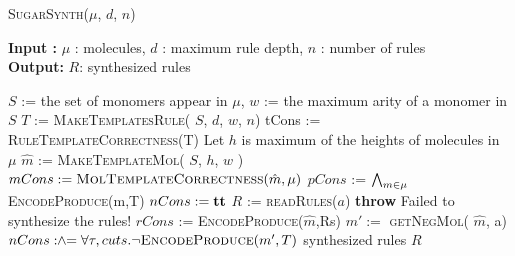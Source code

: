 
\begin{algorithm}[t]
  \caption{ \textsc{SugarSynth}($\mu$, $d$, $n$)}
  \textbf{Input     :} $\mu$ : molecules, $d$ : maximum rule depth, $n$ : number of rules \\
      \textbf{Output:}  $R$: synthesized rules
  \label{alg:sugar-synth}
  \begin{algorithmic}[1]
  \State $S$ := the set of monomers appear in $\mu$, $w$ := the maximum arity of a monomer in $S$
  \State $T$ := \textsc{MakeTemplatesRule}( $S$, $d$, $w$, $n$)
  \label{line:createRtemp}
  \State tCons := \textsc{RuleTemplateCorrectness}(T)
  \label{line:ruleCorr}
  \State Let $h$ is maximum of the heights of molecules in $\mu$
  \State $\hat{m}$ := \textsc{MakeTemplateMol}( $S$, $h$, $w$ )
  \label{line:createMtemp}
  \State $mCons := \textsc{MolTemplateCorrectness}(\hat{m},\mu)$
  \label{line:molCorr}
  \State $pCons$ := $\bigwedge_{m \in \mu}$ \textsc{EncodeProduce}(m,T)
    \label{line:molenc}
  \State $nCons := \mathbf{tt}$
  \While{$\ltrue$} 
    \label{line:posModel}
    \State $R$ := \textsc{readRules}($a$)
    \label{line:getR}
    \Else
       \State \textbf{ throw} Failed to synthesize the rules!
    \EndIf
    \State $rCons$ := \textsc{EncodeProduce}($\hat{m}$,Rs)
    \label{line:consNewR}
        \label{line:negModel}
        \State $m' :=$ \textsc{getNegMol}( $\hat{m}$, a)
        \State $nCons \mathrel{:\hspace{-3pt}\land\hspace{-3pt}=} \forall \tau,cuts. \lnot \textsc{EncodeProduce}(m',T)$
        \label{line:encode-neg-mol}
        \label{line:negCons}
    \Else
       \State \Return synthesized rules $R$
    \EndIf

  \EndWhile
\end{algorithmic}
\end{algorithm}


